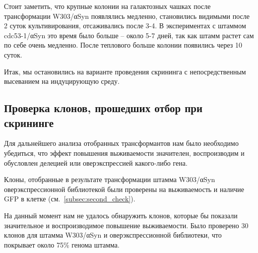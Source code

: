 Стоит заметить, что крупные колонии на галактозных чашках после трансформации W303/αSyn появлялись медленно, становились видимыми после 2 суток культивирования, отсаживались после 3-4.
В экспериментах с штаммом cdc53-1/αSyn это время было больше -- около 5-7  дней, так как штамм растет сам по себе очень медленно. После теплового больше колонии появились через 10 суток.


Итак, мы остановились на варианте проведения скрининга с непосредственным высеванием на индуцирующую среду. 

\subsection{Проверка клонов, прошедших отбор при скрининге}

Для дальнейшего анализа отобранных трансформантов нам было необходимо убедиться, что эффект повышения выживаемости значителен, воспроизводим и обусловлен делецией или оверэкспрессией какого-либо гена. 




Клоны, отобранные в результате трансформации штамма W303/αSyn оверэкспрессионной библиотекой были проверены на выживаемость и наличие GFP в клетке (см.~\ref{subsec:second_check}).



На данный момент нам не удалось обнаружить клонов, которые бы показали значительное и воспроизводимое повышение выживаемости. Было проверено 30 клонов для штамма W303/αSyn и оверэкспрессионной библиотеки, что покрывает около 75\% генома штамма.

